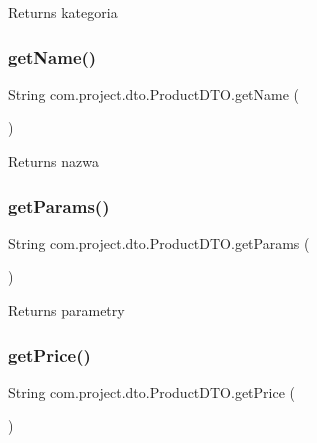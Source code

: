 \begin{DoxyReturn}{Returns}
kategoria 
\end{DoxyReturn}
\mbox{\label{classcom_1_1project_1_1dto_1_1_product_d_t_o_a0c491526298f74ee43962ec79dc233fd}} 
\subsubsection{get\+Name()}
{\footnotesize\ttfamily String com.\+project.\+dto.\+Product\+D\+T\+O.\+get\+Name (\begin{DoxyParamCaption}{ }\end{DoxyParamCaption})}

\begin{DoxyReturn}{Returns}
nazwa 
\end{DoxyReturn}
\mbox{\label{classcom_1_1project_1_1dto_1_1_product_d_t_o_af3625c281faaa57de016bf742221cdae}} 
\subsubsection{get\+Params()}
{\footnotesize\ttfamily String com.\+project.\+dto.\+Product\+D\+T\+O.\+get\+Params (\begin{DoxyParamCaption}{ }\end{DoxyParamCaption})}

\begin{DoxyReturn}{Returns}
parametry 
\end{DoxyReturn}
\mbox{\label{classcom_1_1project_1_1dto_1_1_product_d_t_o_aef28d9f2898e0546b0b115aed3e19046}} 
\subsubsection{get\+Price()}
{\footnotesize\ttfamily String com.\+project.\+dto.\+Product\+D\+T\+O.\+get\+Price (\begin{DoxyParamCaption}{ }\end{DoxyParamCaption})}

